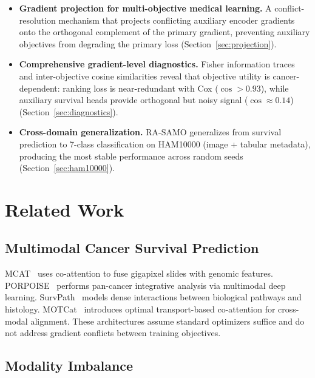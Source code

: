 \documentclass[10pt,twocolumn]{article}
\begin{document}
\begin{itemize}
\item \textbf{Gradient projection for multi-objective medical
learning.} A conflict-resolution mechanism that projects conflicting
auxiliary encoder gradients onto the orthogonal complement of the
primary gradient, preventing auxiliary objectives from degrading
the primary loss (Section~\ref{sec:projection}).

\item \textbf{Comprehensive gradient-level diagnostics.} Fisher
information traces and inter-objective cosine similarities reveal
that objective utility is cancer-dependent: ranking loss is
near-redundant with Cox ($\cos > 0.93$), while auxiliary survival
heads provide orthogonal but noisy signal ($\cos \approx 0.14$)
(Section~\ref{sec:diagnostics}).

\item \textbf{Cross-domain generalization.} RA-SAMO generalizes
from survival prediction to 7-class classification on HAM10000
(image + tabular metadata), producing the most stable performance
across random seeds (Section~\ref{sec:ham10000}).
\end{itemize}


\section{Related Work}

\subsection{Multimodal Cancer Survival Prediction}

MCAT~\cite{chen2021} uses co-attention to fuse gigapixel slides with
genomic features. PORPOISE~\cite{chen2022porpoise} performs pan-cancer
integrative analysis via multimodal deep learning.
SurvPath~\cite{jaume2024survpath} models dense interactions between
biological pathways and histology. MOTCat~\cite{xu2023motcat}
introduces optimal transport-based co-attention for cross-modal
alignment. These architectures assume standard optimizers suffice and
do not address gradient conflicts between training objectives.

\subsection{Modality Imbalance}
\end{document}
